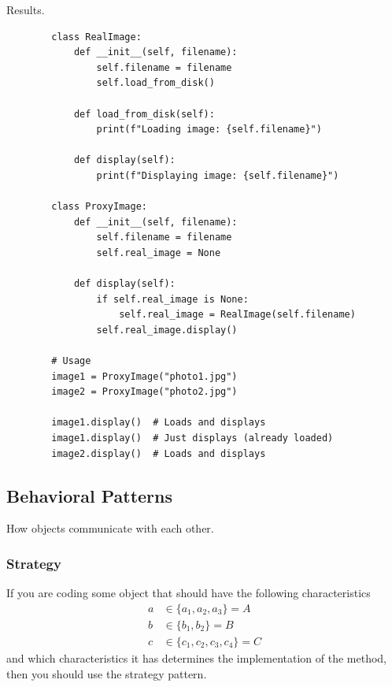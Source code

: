     Results. 

    \begin{example}
      \label{ex:case-study-7}
      \begin{lstlisting}
        class RealImage:
            def __init__(self, filename):
                self.filename = filename
                self.load_from_disk()
            
            def load_from_disk(self):
                print(f"Loading image: {self.filename}")
            
            def display(self):
                print(f"Displaying image: {self.filename}")

        class ProxyImage:
            def __init__(self, filename):
                self.filename = filename
                self.real_image = None
            
            def display(self):
                if self.real_image is None:
                    self.real_image = RealImage(self.filename)
                self.real_image.display()

        # Usage
        image1 = ProxyImage("photo1.jpg")
        image2 = ProxyImage("photo2.jpg")

        image1.display()  # Loads and displays
        image1.display()  # Just displays (already loaded)
        image2.display()  # Loads and displays 
      \end{lstlisting}
    \end{example}

\subsection{Behavioral Patterns} 

  How objects communicate with each other. 

  \subsubsection{Strategy} 

    If you are coding some object that should have the following characteristics 
    \begin{align}
      a & \in \{a_1, a_2, a_3\} = A \\
      b & \in \{b_1, b_2\} = B \\
      c & \in \{c_1, c_2, c_3, c_4\} = C
    \end{align}
    and which characteristics it has determines the implementation of the method, then you should use the strategy pattern.


